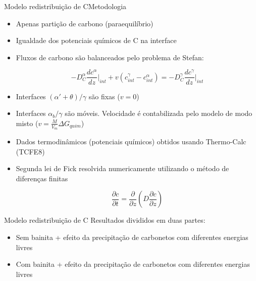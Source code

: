 \begin{frame}{Modelo redistribuição de C}{Metodologia}

  \begin{itemize}
    \item Apenas partição de carbono (paraequilíbrio)

    \item Igualdade dos potenciais químicos de C na interface

    \item Fluxos de carbono são balanceados pelo problema de Stefan:
    
    $$-D_C^\alpha \frac{d c^\alpha}{d z}\Bigg|_{int} + v\left(c^\gamma_{int} - c^\alpha_{int} \right) = -D_C^\gamma \frac{d c^\gamma}{d z}\Bigg|_{int}$$

    \item Interfaces $(\alpha' + \theta)/\gamma$ são fixas ($v = 0$)

    \item Interfaces $\alpha_b/\gamma$ são móveis. Velocidade é contabilizada pelo modelo de modo misto ($v = \frac{M}{V_m} \Delta G_{quim}$)

    \item Dados termodinâmicos (potenciais químicos) obtidos usando Thermo-Calc (TCFE8)

    \item Segunda lei de Fick resolvida numericamente utilizando o método de diferenças finitas
    
    $$ \frac{\partial c}{\partial t} = \frac{\partial}{\partial z} \left( D \frac{\partial c}{\partial z} \right) $$
  \end{itemize}
\end{frame}

\begin{frame}{Modelo redistribuição de C}
  Resultados divididos em duas partes:

  \begin{itemize}
    \item Sem bainita + efeito da precipitação de carbonetos com diferentes energias livres
    \item Com bainita + efeito da precipitação de carbonetos com diferentes energias livres
  \end{itemize}
\end{frame}

